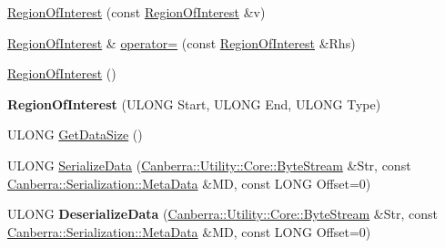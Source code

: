 \begin{DoxyCompactItemize}
\item 
\hyperlink{class_canberra_1_1_data_types_1_1_spectroscopy_1_1_region_of_interest_a9f59cf16468e03812383c3592866ac0b_a9f59cf16468e03812383c3592866ac0b}{Region\+Of\+Interest} (const \hyperlink{class_canberra_1_1_data_types_1_1_spectroscopy_1_1_region_of_interest}{Region\+Of\+Interest} \&v)
\item 
\hyperlink{class_canberra_1_1_data_types_1_1_spectroscopy_1_1_region_of_interest}{Region\+Of\+Interest} \& \hyperlink{class_canberra_1_1_data_types_1_1_spectroscopy_1_1_region_of_interest_ac23add1024b2fa1a5355847f2a633cbe_ac23add1024b2fa1a5355847f2a633cbe}{operator=} (const \hyperlink{class_canberra_1_1_data_types_1_1_spectroscopy_1_1_region_of_interest}{Region\+Of\+Interest} \&Rhs)
\item 
\hyperlink{class_canberra_1_1_data_types_1_1_spectroscopy_1_1_region_of_interest_af101892e364a92b08a3814ead5845338_af101892e364a92b08a3814ead5845338}{Region\+Of\+Interest} ()
\item 
\mbox{\label{class_canberra_1_1_data_types_1_1_spectroscopy_1_1_region_of_interest_adb38924f657cecaa87ed47cbea68b4d7}} 
{\bfseries Region\+Of\+Interest} (U\+L\+O\+NG Start, U\+L\+O\+NG End, U\+L\+O\+NG Type)
\item 
U\+L\+O\+NG \hyperlink{class_canberra_1_1_data_types_1_1_spectroscopy_1_1_region_of_interest_a8050cf3fd587d7932bb42f90df3815ef_a8050cf3fd587d7932bb42f90df3815ef}{Get\+Data\+Size} ()
\item 
U\+L\+O\+NG \hyperlink{class_canberra_1_1_data_types_1_1_spectroscopy_1_1_region_of_interest_a2253a71ec6c74ce4037d8522c5d7f3b3_a2253a71ec6c74ce4037d8522c5d7f3b3}{Serialize\+Data} (\hyperlink{class_canberra_1_1_utility_1_1_core_1_1_byte_stream}{Canberra\+::\+Utility\+::\+Core\+::\+Byte\+Stream} \&Str, const \hyperlink{class_canberra_1_1_serialization_1_1_meta_data}{Canberra\+::\+Serialization\+::\+Meta\+Data} \&MD, const L\+O\+NG Offset=0)
\item 
\mbox{\label{class_canberra_1_1_data_types_1_1_spectroscopy_1_1_region_of_interest_a86e80ee24fd4e763b966c2aeaf9e7823}} 
U\+L\+O\+NG {\bfseries Deserialize\+Data} (\hyperlink{class_canberra_1_1_utility_1_1_core_1_1_byte_stream}{Canberra\+::\+Utility\+::\+Core\+::\+Byte\+Stream} \&Str, const \hyperlink{class_canberra_1_1_serialization_1_1_meta_data}{Canberra\+::\+Serialization\+::\+Meta\+Data} \&MD, const L\+O\+NG Offset=0)

\end{DoxyCompactItemize}
